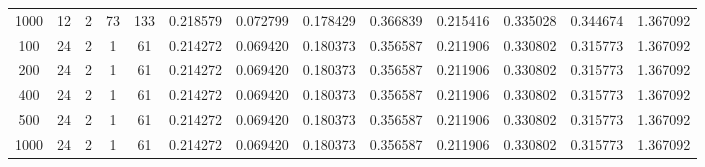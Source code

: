\begin{table}[h]
\begin{tabular}{ccccccccccccc}
1000 & 12 & 2 & 73 & 133 & 0.218579 & 0.072799 & 0.178429 & 0.366839 & 0.215416 & 0.335028 & 0.344674 & 1.367092 \\
100 & 24 & 2 & 1 & 61 & 0.214272 & 0.069420 & 0.180373 & 0.356587 & 0.211906 & 0.330802 & 0.315773 & 1.367092 \\
200 & 24 & 2 & 1 & 61 & 0.214272 & 0.069420 & 0.180373 & 0.356587 & 0.211906 & 0.330802 & 0.315773 & 1.367092 \\
400 & 24 & 2 & 1 & 61 & 0.214272 & 0.069420 & 0.180373 & 0.356587 & 0.211906 & 0.330802 & 0.315773 & 1.367092 \\
500 & 24 & 2 & 1 & 61 & 0.214272 & 0.069420 & 0.180373 & 0.356587 & 0.211906 & 0.330802 & 0.315773 & 1.367092 \\
1000 & 24 & 2 & 1 & 61 & 0.214272 & 0.069420 & 0.180373 & 0.356587 & 0.211906 & 0.330802 & 0.315773 & 1.367092 \\
\bottomrule
\end{tabular}
\end{table}
